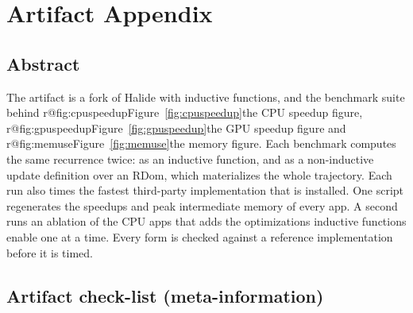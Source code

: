 \newcommand{\artifactdoi}{\href{https://doi.org/10.5281/zenodo.24284710}{10.5281/zenodo.24284710}}
\newcommand{\artfig}[2]{\ifcsname r@#1\endcsname Figure~\ref{#1}\else #2\fi}
\newcommand{\artsec}[2]{\ifcsname r@#1\endcsname Section~\ref{#1}\else #2\fi}

\section{Artifact Appendix}
\sloppy

\subsection{Abstract}

The artifact is a fork of Halide with inductive functions, and the benchmark
suite behind \artfig{fig:cpuspeedup}{the CPU speedup figure},
\artfig{fig:gpuspeedup}{the GPU speedup figure} and
\artfig{fig:memuse}{the memory figure}. Each benchmark computes the same
recurrence twice: as an inductive function, and as a non-inductive
update definition over an RDom, which materializes the whole trajectory.
Each run also times the fastest third-party implementation that is
installed. One script regenerates the speedups and peak intermediate memory
of every app. A second runs an ablation of the CPU apps that adds the
optimizations inductive functions enable one at a time. Every form is checked
against a reference implementation before it is timed.

\subsection{Artifact check-list (meta-information)}

